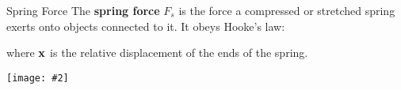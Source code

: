\documentclass[12pt,compress,aspectratio=169]{beamer}
\newcommand{\pic}[2]{\texttt{[image: \#2]}}
\newcommand{\mb}[1]{\ensuremath\mathbf{#1}}
\newcommand{\eq}[2]{\vspace{#1}{\Large\begin{displaymath}#2\end{displaymath}}}
\begin{document}
\begin{frame}{Spring Force}
  The \textbf{spring force} $F_s$ is the force a compressed or stretched spring
  exerts onto objects connected to it. It obeys Hooke's law:
  
  \eq{-.2in}{
    \mb{F}_s=-k\mb{x}
  }
  where $\mb{x}$ is the relative displacement of the ends of the spring.
  \begin{center}
    \pic{.35}{graphics/spring-example1.png}
  \end{center}
\end{frame}





\end{document}
